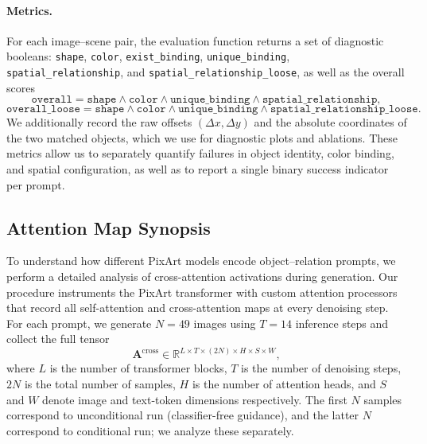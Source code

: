 \paragraph{Metrics.}
For each image–scene pair, the evaluation function returns a set of diagnostic booleans:
\texttt{shape}, \texttt{color}, \texttt{exist\_binding}, \texttt{unique\_binding}, \texttt{spatial\_relationship}, and \texttt{spatial\_relationship\_loose}, as well as the overall scores
\[
\texttt{overall} = \texttt{shape} \land \texttt{color} \land \texttt{unique\_binding} \land \texttt{spatial\_relationship},
\]
\[
\texttt{overall\_loose} = \texttt{shape} \land \texttt{color} \land \texttt{unique\_binding} \land \texttt{spatial\_relationship\_loose}.
\]
We additionally record the raw offsets $(\Delta x,\Delta y)$ and the absolute coordinates of the two matched objects, which we use for diagnostic plots and ablations. These metrics allow us to separately quantify failures in object identity, color binding, and spatial configuration, as well as to report a single binary success indicator per prompt.

\subsection{Attention Map Synopsis}\label{method:attention_map_synopsis}

To understand how different PixArt models encode object–relation prompts, we perform a detailed analysis of cross-attention activations during generation. Our procedure instruments the PixArt transformer with custom attention processors that record all self-attention and cross-attention maps at every denoising step. For each prompt, we generate $N=49$ images using $T=14$ inference steps and collect the full tensor
\[
\mathbf{A}^{\text{cross}} \in 
\mathbb{R}^{L \times T \times (2N) \times H \times S \times W},
\]
where $L$ is the number of transformer blocks, $T$ is the number of denoising steps, $2N$ is the total number of samples, $H$ is the number of attention heads, and $S$ and $W$ denote image and text-token dimensions respectively. The first $N$ samples correspond to unconditional run (classifier-free guidance), and the latter $N$ correspond to conditional run; we analyze these separately.

